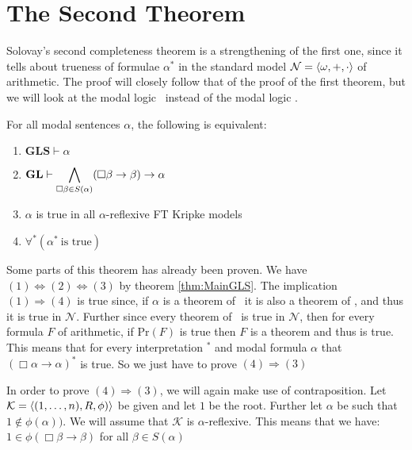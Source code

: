 \documentclass[../main.tex]{subfiles}
\begin{document}
\section{The Second Theorem}
\label{chap:second}
Solovay's second completeness theorem is a strengthening of the first one,
since it tells about trueness of formulae $\alpha^*$ in the standard model
$\mathcal{N}=\langle
\omega,+,\cdot\rangle$ of arithmetic. The proof will closely follow that of the proof of
the first
theorem, but we will look at the modal logic \GLS\ instead of the modal logic
\GL.
\begin{thm}
	For all modal sentences $\alpha$, the following is equivalent:
	\begin{enumerate}
		\item $\textbf{GLS}\vdash\alpha$
		\item $\text{\textbf{GL}}\vdash\displaystyle\bigwedge_{\Box \beta\in
			S(\alpha)}(\Box\beta\rightarrow\beta)\rightarrow\alpha$
		\item $\alpha$ is true in all $\alpha$-reflexive FT Kripke models
		\item $\forall^*(\alpha^*\ \text{is true})$
	\end{enumerate}
\end{thm}
Some parts of this theorem has already been proven. We have
$(1)\Leftrightarrow(2)\Leftrightarrow(3)$ by theorem \ref{thm:MainGLS}. The
implication $(1)\Rightarrow(4)$ is true since, if $\alpha$ is a theorem of \GL\
it is also a theorem of \PRA, and thus it is true in $\mathcal{N}$. Further
since every theorem of \PRA\ is true in $\mathcal{N}$, then for every formula $F$ of
arithmetic, if $\text{Pr}(F)$ is true then $F$ is a theorem and thus is true.
This means that for every interpretation $^*$ and modal formula $\alpha$ that
$(\Box\alpha\rightarrow\alpha)^*$ is true. So we just have to prove
$(4)\Rightarrow(3)$

In order to prove $(4)\Rightarrow(3)$, we will again make use of contraposition. Let
$\mathcal{K}=\langle(1,\ldots,n),R,\phi)\rangle$ be given and let $1$ be the root.
Further let $\alpha$ be such that $1\not\in\phi(\alpha))$.
We
will assume that $\mathcal{K}$ is $\alpha$-reflexive. This means that we have:
$1\in\phi(\Box\beta\rightarrow\beta)$ for all $\beta\in S(\alpha)$
\end{document}
